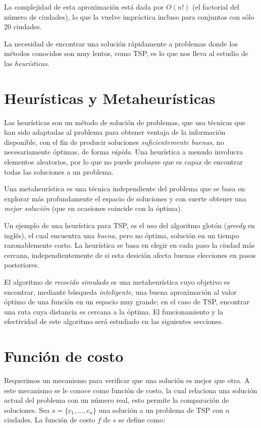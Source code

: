 \documentclass[12pt, letterpaper]{article}
\begin{document}
La complejidad de esta aproximación está dada por $O(n!)$ (el factorial del número de ciudades), lo que la vuelve impráctica incluso para conjuntos con sólo 20 ciudades.
\par
La necesidad de encontrar una solución rápidamente a problemas donde los métodos conocidos son muy lentos, como TSP, es lo que nos lleva al estudio de las \textit{heurísticas}.

\section{Heurísticas y Metaheurísticas}

Las heurísticas son un método de solución de problemas, que usa técnicas que han sido adaptadas al problema para obtener ventaja de la información disponible, con el fin de producir soluciones \textit{suficientemente buenas}, no necesariamente óptimas, de forma \textit{rápida}. Una heurística a menudo involucra elementos aleatorios, por lo que no puede probarse que es capaz de encontrar todas las soluciones a un problema.
\par
Una metaheurística es una técnica independiente del problema que se basa en explorar más profundamente el espacio de soluciones y con suerte obtener una \textit{mejor solución} (que en ocasiones coincide con la óptima).
\par
Un ejemplo de una heurística para TSP, es el uso del algoritmo glotón (\textit{greedy} en inglés), el cual encuentra una \textit{buena}, pero no óptima, solución en un tiempo razonablemente corto. La heurística se basa en elegir en cada paso la ciudad más cercana, independientemente de si esta desición afecta buenas elecciones en pasos posteriores.
\par
El algoritmo de \textit{recocido simulado} es una metaheurística cuyo objetivo es encontrar, mediante búsqueda \textit{inteligente}, una buena aproximación al valor óptimo de una función en un espacio muy grande; en el caso de TSP, encontrar una ruta cuya distancia es cercana a la óptima. El funcionamiento y la efectividad de este algoritmo será estudiado en las siguientes secciones.

\section{Función de costo}

Requerimos un mecanismo para verificar que una solución es mejor que otra. A este mecanismo se le conoce como función de costo, la cual relaciona una solución actual del problema con un número real, esto permite la comparación de soluciones. Sea $s=\{c_1,...,c_n\}$ una solución a un problema de TSP con $n$ ciudades. La función de costo $f$ de $s$ se define como:
\end{document}
